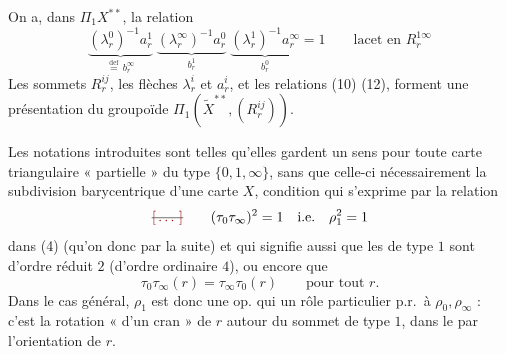 \documentclass[11pt,a4paper]{article}
\begin{document}

On a, dans $\Pi_1 X^{\ast\ast}$, la relation
\begin{equation*}
  \tag{12}
  \boxed{\underbrace{(\lambda^0_r)^{-1} a^1_r}_{\overset{\text{def}}{=}\, b^\infty_r}\;
  \underbrace{(\lambda^\infty_r)^{-1} a^0_r}_{b^1_r}\;
  \underbrace{(\lambda^1_r)^{-1} a^\infty_r}_{b^0_r} = 1}
  \qquad \text{lacet en } R^{1\infty}_r
\end{equation*}
Les sommets $R^{ij}_r$, les flèches $\lambda^i_r$ et $a^i_r$, et les relations (10) (12), forment une présentation du groupoïde $\Pi_1(\tilde X^{\ast\ast}, (R^{ij}_r))$.


Les notations introduites sont telles qu'elles gardent un sens pour toute carte triangulaire « partielle » du type $\{0, 1, \infty\}$, sans que celle-ci   nécessairement la subdivision barycentrique d'une carte $X$, condition qui s'exprime par la   relation
\[
  \text{\struck{\ill{}}} \qquad (\tau_0 \tau_\infty)^2 = 1 \quad \text{i.e.} \quad \rho_1^2 = 1
\]
dans (4) (qu'on  donc par la suite) et qui signifie aussi que les   de type $1$ sont d'ordre réduit $2$ (d'ordre ordinaire $4$), ou encore que
\[
  \tau_0 \tau_\infty(r) = \tau_\infty \tau_0(r) \qquad \text{pour tout } r.
\]
Dans le cas général, $\rho_1$ est donc une op. qui  un rôle particulier p.r.\ à $\rho_0, \rho_\infty$ : c'est la rotation « d'un cran » de $r$ autour du sommet de type $1$, dans le \struck{\ill{}}  par l'orientation de $r$.
\end{document}
